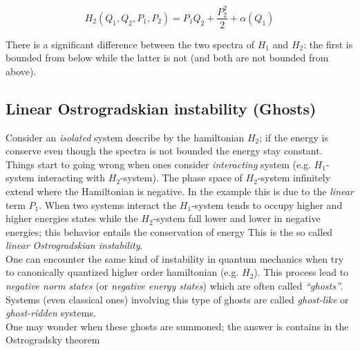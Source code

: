 \begin{equation} \label{eq: second-order_motion_eq_ham}
  H_2(Q_1, Q_2, P_1, P_2) = P_1Q_2 + \frac{P_2^2}{2} + \alpha(Q_1)
\end{equation}

There is a significant difference between the two spectra of $H_1$ and $H_2$:
the first is bounded from below while the latter is not (and both are not
bounded from above).


\subsection{Linear Ostrogradskian instability (Ghosts)}
Consider an \emph{isolated} system describe by the hamiltonian $H_2$; if the
energy is conserve even though the spectra is not bounded the energy stay
constant. Things start to going wrong when ones consider \emph{interacting}
system (e.g. $H_1$-system interacting with $H_2$-system). The phase space of
$H_2$-system infinitely extend where the Hamiltonian is negative. In the example
this is due to the \emph{linear} term $P_1$. When two systems interact the
$H_1$-system tends to occupy higher and higher energies states while the
$H_2$-system fall lower and lower in negative energies; this behavior entails
the conservation of energy %
This is the so called \emph{linear Ostrogradskian instability}. \\

One can encounter the same kind of instability in quantum mechanics when try to
canonically quantized higher order hamiltonian (e.g. $H_2$). This process lead
to \emph{negative norm states} (or \emph{negative energy states}) which are
often called \emph{``ghosts''}. Systems (even classical ones) involving this
type of ghosts are called \emph{ghost-like} or \emph{ghost-ridden} systems. \\

One may wonder when these ghosts are summoned; the answer is contains in the
Ostrogradsky theorem %

